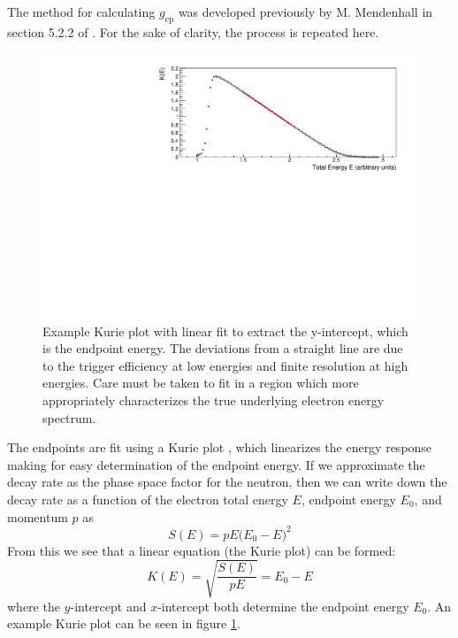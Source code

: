 The method for calculating $g_{\mathrm{ep}}$ was developed previously by M. Mendenhall in section
5.2.2 of \cite{mpmThesis}. For the sake of clarity, the process is repeated here.

\begin{figure}
  \centering
  \includegraphics[scale=0.75]{3-UCNAAnalysis/kuriePlot.pdf}
  \caption{Example Kurie plot with linear fit to extract the y-intercept, which is
    the endpoint energy. The deviations from a straight line are due to the
    trigger efficiency at low energies and finite resolution at high energies. Care
    must be taken to fit in a region which more appropriately characterizes the true
    underlying electron energy spectrum.}
  \label{fig:kuriePlot}
\end{figure}
  

The endpoints are fit using a Kurie plot \cite{kurie1936radiations}, which linearizes the
energy response making for easy determination of the endpoint energy. If we approximate
the decay rate as the phase space factor for the neutron, then we can write down
the decay rate as a function of the electron total energy $E$, endpoint
energy $E_0$, and momentum $p$ as
%
\begin{equation}
  S(E) = pE\big(E_0-E\big)^2
\end{equation}
%
From this we see that a linear equation (the Kurie plot) can be formed:
%
\begin{equation}
  K(E) = \sqrt{\frac{S(E)}{pE}} = E_0-E
\end{equation}
%
where the $y$-intercept and $x$-intercept both determine the endpoint energy $E_0$.
An example Kurie plot can be seen in figure \ref{fig:kuriePlot}.

